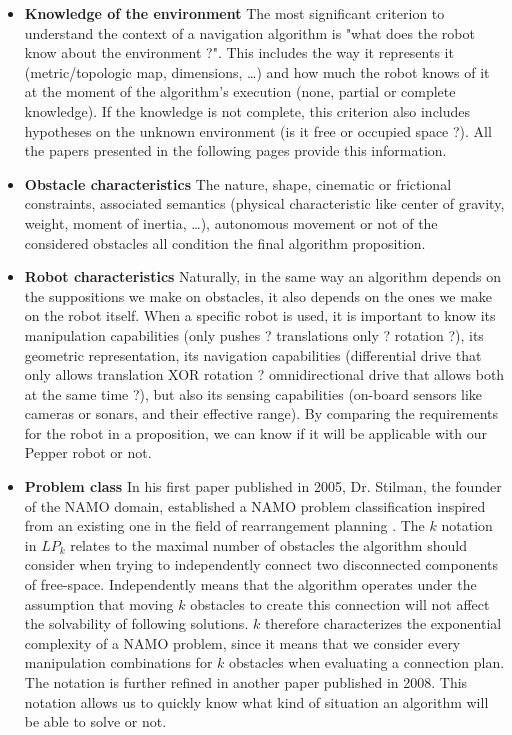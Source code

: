 \begin{itemize}
  \item \textbf{Knowledge of the environment} The most significant criterion to understand the context of a navigation algorithm is "what does the robot know about the environment ?". This includes the way it represents it (metric/topologic map, dimensions, \dots) and how much the robot knows of it at the moment of the algorithm's execution (none, partial or complete knowledge). If the knowledge is not complete, this criterion also includes hypotheses on the unknown environment (is it free or occupied space ?). All the papers presented in the following pages provide this information.
  \item \textbf{Obstacle characteristics} The nature, shape, cinematic or frictional constraints, associated semantics (physical characteristic like center of gravity, weight, moment of inertia, \dots), autonomous movement or not of the considered obstacles all condition the final algorithm proposition.
  \item \textbf{Robot characteristics} Naturally, in the same way an algorithm depends on the suppositions we make on obstacles, it also depends on the ones we make on the robot itself. When a specific robot is used, it is important to know its manipulation capabilities (only pushes ? translations only ? rotation ?), its geometric representation, its navigation capabilities (differential drive that only allows translation XOR rotation ? omnidirectional drive that allows both at the same time ?), but also its sensing capabilities (on-board sensors like cameras or sonars, and their effective range). By comparing the requirements for the robot in a proposition, we can know if it will be applicable with our Pepper robot or not.
  \item \textbf{Problem class} In his first paper \parencite{stilman_navigation_2005} published in 2005, Dr. Stilman, the founder of the NAMO domain, established a NAMO problem classification inspired from an existing one in the field of rearrangement planning \parencite{ben-shahar_practical_1998}. The $k$ notation in $LP_k$ relates to the maximal number of obstacles the algorithm should consider when trying to independently connect two disconnected components of free-space. Independently means that the algorithm operates under the assumption that moving $k$ obstacles to create this connection will not affect the solvability of following solutions. $k$ therefore characterizes the exponential complexity of a NAMO problem, since it means that we consider every manipulation combinations for $k$ obstacles when evaluating a connection plan. The notation is further refined in another paper \parencite{stilman_planning_2008} published in 2008. This notation allows us to quickly know what kind of situation an algorithm will be able to solve or not.
\end{itemize}

